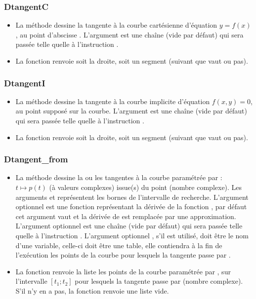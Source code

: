 \subsubsection{DtangentC}
\begin{itemize}
    \item La méthode  dessine la tangente à la courbe cartésienne d'équation \(y=f(x)\), au point d'abscisse . \arguLong{} L'argument  est une chaîne (vide par défaut) qui sera passée telle quelle à l'instruction \drawcmd.
    \item La fonction  renvoie soit la droite, soit un segment (suivant que  vaut \nil ou pas).
\end{itemize}

\subsubsection{DtangentI}
\begin{itemize}
    \item La méthode  dessine la tangente à la courbe implicite d'équation \(f(x,y)=0\), au point  supposé sur la courbe. \arguLong{} L'argument  est une chaîne (vide par défaut) qui sera passée telle quelle à l'instruction \drawcmd.
    \item La fonction  renvoie soit la droite, soit un segment (suivant que  vaut \nil ou pas).
\end{itemize}

\subsubsection{Dtangent\_from}
\begin{itemize}
    \item La méthode  dessine la ou les tangentes à la courbe paramétrée par : \(t \mapsto p(t)\) (à valeurs complexes) issue(s) du point  (nombre complexe). Les arguments  et  représentent les bornes de l'intervalle de recherche. L'argument optionnel  est une fonction représentant la dérivée de la fonction , par défaut cet argument vaut \nil et la dérivée de  est remplacée par une approximation. L'argument optionnel  est une chaîne (vide par défaut) qui sera passée telle quelle à l'instruction \drawcmd. L'argument optionnel , s'il est utilisé, doit être le nom d'une variable, celle-ci doit être une table, elle contiendra à la fin de l'exécution les points de la courbe pour lesquels la tangente passe par . \arguScale
    \item La fonction  renvoie la liste les points de la courbe paramétrée par , sur l'intervalle \([t_1;t_2]\) pour lesquels la tangente passe par  (nombre complexe). S'il n'y en a pas, la fonction renvoie une liste vide.
\end{itemize}

